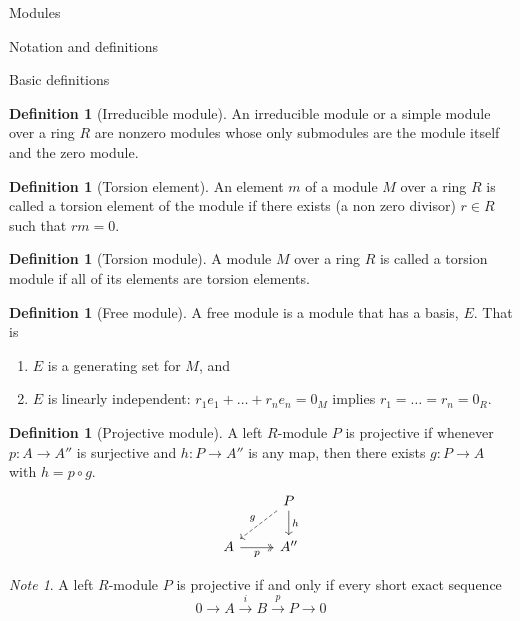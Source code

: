 \documentclass{article}
\theoremstyle{definition}
\numberwithin{theorem}{subsection} %
\theoremstyle{remark}
\newtheorem*{remark}{Note}
\theoremstyle{definition}
\newtheorem{definition}[paragraph]{Definition}
\newcommand{\fn}[3]{{#1 \colon #2 \rightarrow #3}}
\begin{document}
\begin{section}{Modules}
  \begin{subsection}{Notation and definitions}
    \begin{subsubsection}{Basic definitions}
      \begin{definition}[Irreducible module]
        An irreducible module or a simple module over a ring $R$ are
        nonzero modules whose only submodules are the module itself and the zero
        module.
      \end{definition}
      \begin{definition}[Torsion element]
        An element $m$ of a module $M$ over a ring $R$ is called a torsion element
        of the module if there exists (a non zero divisor) $r \in R$ such that
        $rm = 0$.
      \end{definition}
      \begin{definition}[Torsion module]
        A module $M$ over a ring $R$ is called a torsion module if all of its
        elements are torsion elements.
      \end{definition}
      \begin{definition}[Free module]
        A free module is a module that has a basis, $E$. That is \begin{enumerate}
          \item $E$ is a generating set for $M$, and
          \item $E$ is linearly independent: $r_1e_1 + \hdots + r_ne_n = 0_M$
          implies $r_1 = \hdots = r_n = 0_R$.
        \end{enumerate}
      \end{definition}
      \begin{definition}[Projective module]
        A left $R$-module $P$ is projective if whenever $\fn p A {A''}$ is
        surjective and $\fn h P {A''}$ is any map, then there exists $\fn g P A$
        with $h = p \circ g$. \[
          \begin{tikzcd}
            & P \arrow[dl, dashrightarrow, "g", swap] \arrow[d, "h"] \\
            A \arrow[r, twoheadrightarrow, "p", swap] & A''
          \end{tikzcd}
        \]
      \end{definition}
      \begin{remark}
        A left $R$-module $P$ is projective if and only if every short exact
        sequence \[
          0 \rightarrow A \xrightarrow{i} B  \xrightarrow{p} P \longrightarrow 0
\]
\end{remark}
\end{subsubsection}
\end{subsection}
\end{section}
\end{document}
